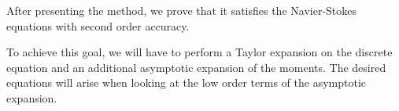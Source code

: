 After presenting the method, we prove that it satisfies the Navier-Stokes equations with second order accuracy.

To achieve this goal, we will have to perform a Taylor expansion on the discrete equation and an additional asymptotic expansion of the moments.
The desired equations will arise when looking at the low order terms of the asymptotic expansion.
